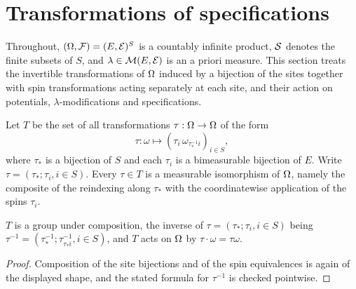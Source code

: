 \section{Transformations of specifications}

Throughout, $(\Omega, \mathcal{F}) = (E, \mathcal{E})^S$ is a countably infinite product,
$\mathcal{S}$ denotes the finite subsets of $S$, and $\lambda \in \mathcal{M}(E, \mathcal{E})$ is an a
priori measure.  This section treats the invertible transformations of $\Omega$ induced by a
bijection of the sites together with spin transformations acting separately at each site, and
their action on potentials, $\lambda$-modifications and specifications.

\begin{definition}
    \label{def:trans-transformation}
    \leanok

    Let $T$ be the set of all transformations $\tau : \Omega \to \Omega$ of the form
    \[\tau : \omega \mapsto (\tau_i\,\omega_{\tau_*^{-1} i})_{i \in S},\]
    where $\tau_*$ is a bijection of $S$ and each $\tau_i$ is a bimeasurable bijection of $E$.
    Write $\tau = (\tau_*; \tau_i, i \in S)$.  Every $\tau \in T$ is a measurable
    isomorphism of $\Omega$, namely the composite of the reindexing along $\tau_*$ with the
    coordinatewise application of the spins $\tau_i$.
\end{definition}

\begin{lemma}
    \label{lem:trans-group}
    \leanok

    $T$ is a group under composition, the inverse of $\tau = (\tau_*; \tau_i, i \in S)$ being
    $\tau^{-1} = (\tau_*^{-1}; \tau_{\tau_* i}^{-1}, i \in S)$, and $T$ acts on $\Omega$ by
    $\tau \cdot \omega = \tau\omega$.
\end{lemma}
\begin{proof}
    \leanok

    Composition of the site bijections and of the spin equivalences is again of the displayed
    shape, and the stated formula for $\tau^{-1}$ is checked pointwise.
\end{proof}


